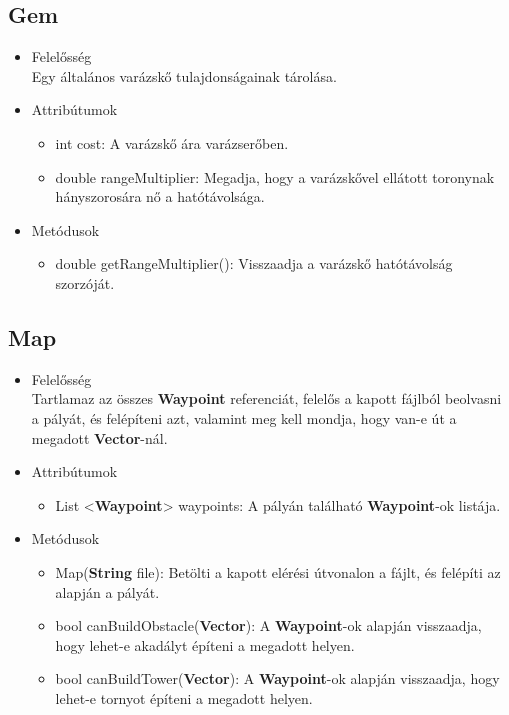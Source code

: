 \subsection{Gem}
\begin{itemize}
\item Felelősség\\
Egy általános varázskő tulajdonságainak tárolása.
\item Attribútumok
	\begin{itemize}
		\item int cost: A varázskő ára varázserőben.
		\item double rangeMultiplier: Megadja, hogy a varázskővel ellátott toronynak hányszorosára nő a hatótávolsága.
	\end{itemize}
\item Metódusok
	\begin{itemize}
		\item double getRangeMultiplier(): Visszaadja a varázskő hatótávolság szorzóját.
	\end{itemize}
\end{itemize}


\subsection{Map}
\begin{itemize}
\item Felelősség\\
Tartlamaz az összes \textbf{Waypoint} referenciát, felelős a kapott fájlból beolvasni a pályát, és felépíteni azt, valamint meg kell mondja, hogy van-e út a megadott \textbf{Vector}-nál.
\item Attribútumok
	\begin{itemize}
		\item List <\textbf{Waypoint}> waypoints: A pályán található \textbf{Waypoint}-ok listája.
	\end{itemize}
\item Metódusok
	\begin{itemize}
		\item Map(\textbf{String} file): Betölti a kapott elérési útvonalon a fájlt, és felépíti az alapján a pályát.
		\item bool canBuildObstacle(\textbf{Vector}): A \textbf{Waypoint}-ok alapján visszaadja, hogy lehet-e akadályt építeni a megadott helyen.
		\item bool canBuildTower(\textbf{Vector}): A \textbf{Waypoint}-ok alapján visszaadja, hogy lehet-e tornyot építeni a megadott helyen.
	\end{itemize}
\end{itemize}


